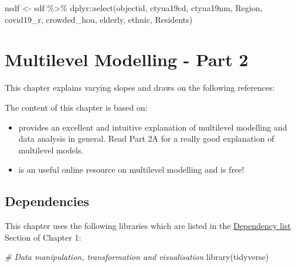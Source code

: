 \documentclass[
]{book}
\newenvironment{Shaded}{\begin{snugshade}}{\end{snugshade}}
\newcommand{\CommentTok}[1]{\textcolor[rgb]{0.56,0.35,0.01}{\textit{#1}}}
\newcommand{\FunctionTok}[1]{\textcolor[rgb]{0.00,0.00,0.00}{#1}}
\newcommand{\NormalTok}[1]{#1}
\newcommand{\OtherTok}[1]{\textcolor[rgb]{0.56,0.35,0.01}{#1}}
\newcommand{\SpecialCharTok}[1]{\textcolor[rgb]{0.00,0.00,0.00}{#1}}
\begin{document}
\begin{Shaded}
\begin{Highlighting}[]
\NormalTok{nsdf }\OtherTok{\textless{}{-}}\NormalTok{ sdf  }\SpecialCharTok{\%\textgreater{}\%}\NormalTok{  dplyr}\SpecialCharTok{::}\FunctionTok{select}\NormalTok{(objectid, }
\NormalTok{                         ctyua19cd, }
\NormalTok{                         ctyua19nm, }
\NormalTok{                         Region, }
\NormalTok{                         covid19\_r, }
\NormalTok{                         crowded\_hou, }
\NormalTok{                         elderly, }
\NormalTok{                         ethnic, }
\NormalTok{                         Residents)}
\end{Highlighting}
\end{Shaded}

\hypertarget{mlm2}{%
\chapter{Multilevel Modelling - Part 2}\label{mlm2}}

This chapter explains varying slopes and draws on the following references:

The content of this chapter is based on:

\begin{itemize}
\item
  \citet{Gelman_Hill_2006_book} provides an excellent and intuitive explanation of multilevel modelling and data analysis in general. Read Part 2A for a really good explanation of multilevel models.
\item
  \citet{bristol2020} is an useful online resource on multilevel modelling and is free!
\end{itemize}

\hypertarget{dependencies-5}{%
\section{Dependencies}\label{dependencies-5}}

This chapter uses the following libraries which are listed in the \protect\hyperlink{dependency-list}{Dependency list} Section of Chapter 1:

\begin{Shaded}
\begin{Highlighting}[]
\CommentTok{\# Data manipulation, transformation and visualisation}
\FunctionTok{library}\NormalTok{(tidyverse)}
\end{Highlighting}
\end{Shaded}
\end{document}
